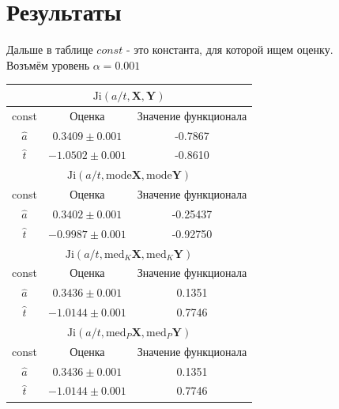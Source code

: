 \documentclass[10pt]{article}
\begin{document}
\section{Результаты}
Дальше в таблице $const$ - это константа, для которой ищем оценку.\\
Возъмём уровень $\alpha=0.001$

\begin{center}
\begin{tabular}{|c|c|c|}
\hline
\multicolumn{3}{|c|}{$\text{Ji} (a/t, \mathbf{X}, \mathbf{Y})$ }\\
\hline
const&Оценка&Значение функционала\\
\hline
$\hat{a}$&$ 0.3409\pm0.001$&-0.7867\\
\hline
$\hat{t}$&$-1.0502\pm0.001$&-0.8610\\
\hline
\hline
\multicolumn{3}{|c|}{$\text{Ji} (a/t, \text{mode} \mathbf{X}, \text{mode} \mathbf{Y})$ }\\
\hline
const&Оценка&Значение функционала\\
\hline
$\hat{a}$&$0.3402\pm0.001$&-0.25437\\
\hline
$\hat{t}$&$-0.9987\pm0.001$&-0.92750\\
\hline
\hline
\multicolumn{3}{|c|}{$\text{Ji} (a/t, \text{med}_K \mathbf{X}, \text{med}_K \mathbf{Y})$}\\
\hline
const&Оценка&Значение функционала\\
\hline
$\hat{a}$&$0.3436\pm0.001$&0.1351\\
\hline
\hline
$\hat{t}$&$-1.0144\pm0.001$&0.7746\\
\hline
\multicolumn{3}{|c|}{$\text{Ji} (a/t, \text{med}_P \mathbf{X}, \text{med}_P \mathbf{Y})$}\\
\hline
const&Оценка&Значение функционала\\
\hline
$\hat{a}$&$0.3436\pm0.001$&0.1351\\
\hline
$\hat{t}$&$-1.0144\pm0.001$&0.7746\\
\hline
\end{tabular}
\end{center}\\


\newpage
\end{document}
